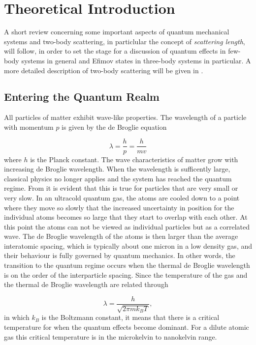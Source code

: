 \section{Theoretical Introduction}
A short review concerning some important aspects of quantum mechanical systems and two-body scattering, in particlular the concept of \emph{scattering length}, will follow, in order to set the stage for a discussion of quantum effects in few-body systems in general and Efimov states in three-body systems in particular. A more detailed description of two-body scattering will be given in .

\subsection{Entering the Quantum Realm}
All particles of matter exhibit wave-like properties. The wavelength of a particle with momentum $p$ is given by the de Broglie equation

\begin{equation} \label{eq:1}
\lambda = \frac{h}{p} = \frac{h}{mv}
\end{equation}
where $h$ is the Planck constant. The wave characteristics of matter grow with increasing de Broglie wavelength. When the wavelength is sufficently large, classical physics no longer applies and the system has reached the quantum regime. From  it is evident that this is true for particles that are very small or very slow. In an ultracold quantum gas, the atoms are cooled down to a point where they move so slowly that the increased uncertainty in position for the individual atoms becomes so large that they start to overlap with each other. At this point the atoms can not be viewed as individual particles but as a correlated wave. The de Broglie wavelength of the atoms is then larger than the average interatomic spacing, which is typically about one micron in a low density gas, and their behaviour is fully governed by quantum mechanics. In other words, the transition to the quantum regime occurs when the thermal de Broglie wavelength is on the order of the interparticle spacing. Since the temperature of the gas and the thermal de Broglie wavelength are related through

\begin{equation}
\lambda = \frac{h}{\sqrt{2\pi m k_B T}},
\end{equation}
in which $k_B$ is the Boltzmann constant, it means that there is a critical temperature for when the quantum effects become dominant. For a dilute atomic gas this critical temperature is in the microkelvin to nanokelvin range.

